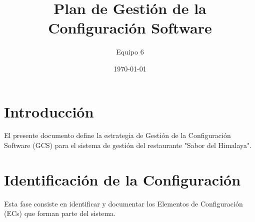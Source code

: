 \documentclass[11pt,a4paper]{article}
\title{\textbf{Plan de Gestión de la Configuración Software}}
\author{Equipo 6}
\date{\today}
\begin{document}
\maketitle

\tableofcontents 
\newpage

\section{Introducción}
El presente documento define la estrategia de Gestión de la Configuración Software (GCS) para el sistema de gestión del restaurante "Sabor del Himalaya". 

\section{Identificación de la Configuración}
\sloppy
Esta fase consiste en identificar y documentar los Elementos de Configuración (ECs) que forman parte del sistema.
\end{document}
